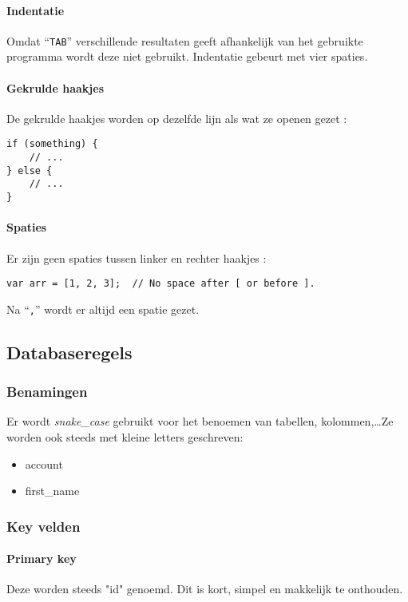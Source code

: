 \paragraph{Indentatie}
Omdat ``\lstinline{TAB}'' verschillende resultaten geeft afhankelijk van het gebruikte programma wordt deze niet gebruikt. Indentatie gebeurt met vier spaties.

\paragraph{Gekrulde haakjes}
De gekrulde haakjes worden op dezelfde lijn als wat ze openen gezet :\\
\begin{lstlisting}
if (something) {
    // ...
} else {
    // ...
}
\end{lstlisting}

\paragraph{Spaties}
Er zijn geen spaties tussen linker en rechter haakjes :\\
\begin{lstlisting}
var arr = [1, 2, 3];  // No space after [ or before ].
\end{lstlisting}

Na ``\lstinline{,}'' wordt er altijd een spatie gezet.

\subsection{Databaseregels}

\subsubsection{Benamingen}
Er wordt \textit{snake\_case} gebruikt voor het benoemen van tabellen, kolommen,\ldots Ze worden ook steeds met kleine letters geschreven:
\begin{itemize}
\item account
\item first\_name
\end{itemize}
\subsubsection{Key velden}
\paragraph{Primary key}
Deze worden steeds "id" genoemd. Dit is kort, simpel en makkelijk te onthouden.
